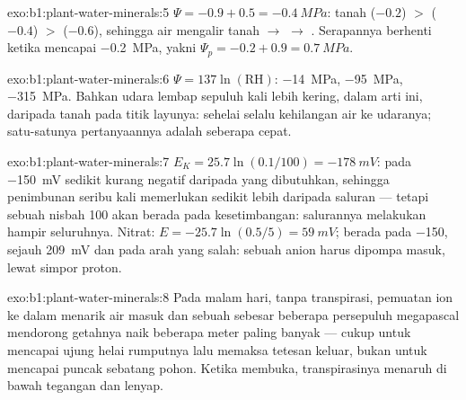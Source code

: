 \begin{solution}{exo:b1:plant-water-minerals:5}
 $\Psi = -0.9 + 0.5 = \qty{-0.4}{MPa}$: tanah ($-0.2$) $>$ 
($-0.4$) $>$  ($-0.6$), sehingga air mengalir tanah $\to$ 
$\to$ . Serapannya berhenti ketika  mencapai
\qty{-0.2}{MPa}, yakni
$\Psi_p = -0.2 + 0.9 = \qty{0.7}{MPa}$.
\end{solution}

\begin{solution}{exo:b1:plant-water-minerals:6}
$\Psi = 137\ln(\text{RH})$: \qty{-14}{MPa}, \qty{-95}{MPa},
\qty{-315}{MPa}. Bahkan udara lembap sepuluh kali lebih kering, dalam
arti ini, daripada tanah pada titik layunya: sehelai  selalu
kehilangan air ke udaranya; satu-satunya pertanyaannya adalah seberapa
cepat.
\end{solution}

\begin{solution}{exo:b1:plant-water-minerals:7}
$E_K = 25.7\ln(0.1/100) = \qty{-178}{mV}$: pada \qty{-150}{mV} 
sedikit kurang negatif daripada yang dibutuhkan, sehingga penimbunan
seribu kali memerlukan sedikit lebih daripada saluran --- tetapi sebuah
nisbah 100 akan berada pada kesetimbangan: salurannya melakukan hampir
seluruhnya. Nitrat: $E = -25.7\ln(0.5/5)
= \qty{+59}{mV}$;  berada pada \qty{-150}{}, sejauh \qty{209}{mV}
dan pada arah yang salah: sebuah anion harus dipompa masuk, lewat
simpor proton.
\end{solution}

\begin{solution}{exo:b1:plant-water-minerals:8}
Pada malam hari, tanpa transpirasi, pemuatan ion ke dalam 
menarik air masuk dan sebuah  sebesar beberapa persepuluh
megapascal mendorong getahnya naik beberapa meter paling banyak ---
cukup untuk mencapai ujung helai rumputnya lalu memaksa tetesan
keluar, bukan untuk mencapai puncak sebatang pohon. Ketika 
membuka, transpirasinya menaruh  di bawah tegangan dan  lenyap.
\end{solution}

